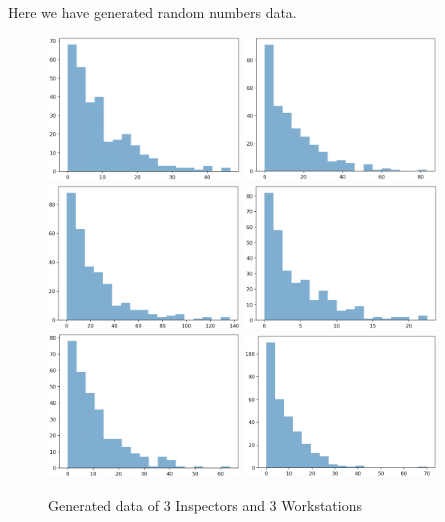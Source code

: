 \documentclass{article}
\begin{document}
Here we have generated random numbers data.

\begin{figure}[htbp]
\begin{center}
\includegraphics[width=2in]{generate1.png}
\includegraphics[width=2in]{generate2.png}
\includegraphics[width=2in]{generate3.png}
\includegraphics[width=2in]{generate4.png}
\includegraphics[width=2in]{generate5.png}
\includegraphics[width=2in]{generate6.png}
\caption{Generated data of 3 Inspectors and 3 Workstations}
\label{data}
\end{center}
\end{figure}
\end{document}
